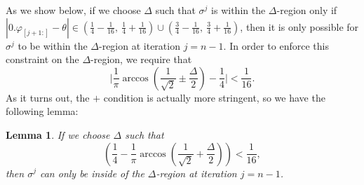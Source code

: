 \documentclass[aps,pra,showpacs,notitlepage,twocolumn,superscriptaddress,nofootinbib]{revtex4-1}
\newtheorem{lemma}[theorem]{Lemma}
\begin{document}
As we show below, if we choose $\Delta$ such that $\sigma^j$ is within the $\Delta$-region only if $|0.\varphi_{[j+1:]} - \theta| \in (\frac{1}{4} - \frac{1}{16},\ \frac{1}{4} + \frac{1}{16}) \cup (\frac{3}{4} - \frac{1}{16},\ \frac{3}{4} + \frac{1}{16})$, then it is only possible for $\sigma^j$ to be within the $\Delta$-region at iteration $j=n-1$. In order to enforce this constraint on the $\Delta$-region, we require that 
\begin{equation}
    \Big| \frac{1}{\pi}\arccos\left( \frac{1}{\sqrt{2}} \pm \frac{\Delta}{2} \right) - \frac{1}{4} \Big| < \frac{1}{16}.
\end{equation}
As it turns out, the $+$ condition is actually more stringent, so we have the following lemma:
\begin{lemma}\label{lemma:Delta_restriction}
If we choose $\Delta$ such that 
\begin{equation}
    \left( \frac{1}{4} - \frac{1}{\pi}\arccos( \frac{1}{\sqrt{2}} + \frac{\Delta}{2}) \right) < \frac{1}{16},
\end{equation}
then $\sigma^j$ can only be inside of the $\Delta$-region at iteration $j=n-1$. 
\end{lemma}
\end{document}
